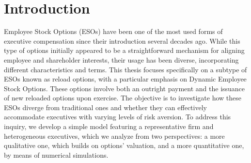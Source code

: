 \section{Introduction}
Employee Stock Options (ESOs) have been one of the most used forms of executive compensation since their introduction several decades ago. While this type of options initially appeared to be a straightforward mechanism for aligning employee and shareholder interests, their usage has been diverse, incorporating different characteristics and terms. This thesis focuses specifically on a subtype of ESOs known as reload options, with a particular emphasis on Dynamic Employee Stock Options. These options involve both an outright payment and the issuance of new reloaded options upon exercise. The objective is to investigate how these ESOs diverge from traditional ones and whether they can effectively accommodate executives with varying levels of risk aversion. To address this inquiry, we develop a simple model featuring a representative firm and heterogeneous executives, which we analyze from two perspectives: a more qualitative one, which builds on options' valuation, and a more quantitative one, by means of numerical simulations.


